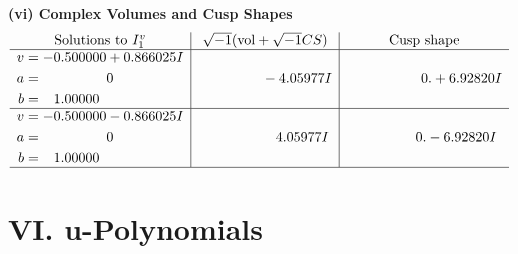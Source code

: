 \documentclass[1p]{elsarticle_modified}
\theoremstyle{definition}
\newcommand{\I}{\sqrt{-1}}
\begin{document}
\newpage\flushleft \textbf{(vi) Complex Volumes and Cusp Shapes}
$$\begin{array}{c|c|c}  
\text{Solutions to }I^v_{1}& \I (\text{vol} + \sqrt{-1}CS) & \text{Cusp shape}\\
 \hline 
\begin{aligned}
v &= -0.500000 + 0.866025 I \\
a &= \phantom{-0.000000 } 0 \\
b &= \phantom{-}1.00000\phantom{ +0.000000I}\end{aligned}
 & \phantom{-0.000000 } -4.05977 I & \phantom{-0.000000 -}0. + 6.92820 I \\ \hline\begin{aligned}
v &= -0.500000 - 0.866025 I \\
a &= \phantom{-0.000000 } 0 \\
b &= \phantom{-}1.00000\phantom{ +0.000000I}\end{aligned}
 & \phantom{-0.000000 -}4.05977 I & \phantom{-0.000000 } 0. - 6.92820 I\\
 \hline 
 \end{array}$$\newpage
\newpage\renewcommand{\arraystretch}{1}
\centering \section*{ VI. u-Polynomials}
\end{document}
